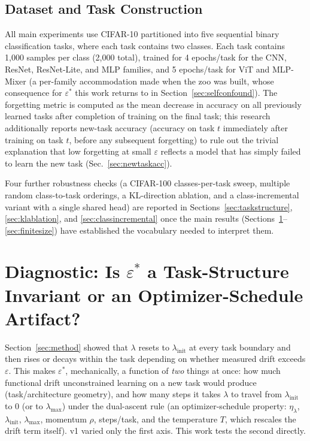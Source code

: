 \documentclass[11pt]{article}
\newcommand{\eps}{\varepsilon}
\newcommand{\epsstar}{\eps^{*}}
\begin{document}
\subsection{Dataset and Task Construction}
All main experiments use CIFAR-10 \citep{krizhevsky2009learning} partitioned
into five sequential binary classification tasks, where each task contains
two classes. Each task contains 1{,}000 samples per class (2{,}000 total),
trained for 4 epochs/task for the CNN, ResNet, ResNet-Lite, and MLP
families, and 5 epochs/task for ViT and MLP-Mixer (a per-family
accommodation made when the zoo was built, whose consequence for $\epsstar$
this work returns to in Section~\ref{sec:selfconfound}). The forgetting metric is computed as the
mean decrease in accuracy on all previously learned tasks after completion of
training on the final task; this research additionally reports new-task accuracy
(accuracy on task $t$ immediately after training on task $t$, before any
subsequent forgetting) to rule out the trivial explanation that low
forgetting at small $\eps$ reflects a model that has simply failed to learn
the new task (Sec.~\ref{sec:newtaskacc}).

Four further robustness checks (a CIFAR-100 classes-per-task sweep,
multiple random class-to-task orderings, a KL-direction ablation, and a
class-incremental variant with a single shared head) are reported in
Sections~\ref{sec:taskstructure}, \ref{sec:klablation}, and
\ref{sec:classincremental} once the main results (Sections~\ref{sec:diagnostic}--\ref{sec:finitesize})
have established the vocabulary needed to interpret them.

\section{Diagnostic: Is $\epsstar$ a Task-Structure Invariant or an Optimizer-Schedule Artifact?}
\label{sec:diagnostic}

Section~\ref{sec:method} showed that $\lambda$ resets to $\lambda_{\mathrm{init}}$
at every task boundary and then rises or decays within the task depending on
whether measured drift exceeds $\eps$. This makes $\epsstar$, mechanically, a
function of \emph{two} things at once: how much functional drift
unconstrained learning on a new task would produce (task/architecture
geometry), and how many steps it takes $\lambda$ to travel from
$\lambda_{\mathrm{init}}$ to 0 (or to $\lambda_{\max}$) under the dual-ascent
rule (an optimizer-schedule property: $\eta_\lambda$, $\lambda_{\mathrm{init}}$,
$\lambda_{\max}$, momentum $\rho$, steps/task, and the temperature $T$, which
rescales the drift term itself). v1 varied only the first axis. This work tests the
second directly.
\end{document}
